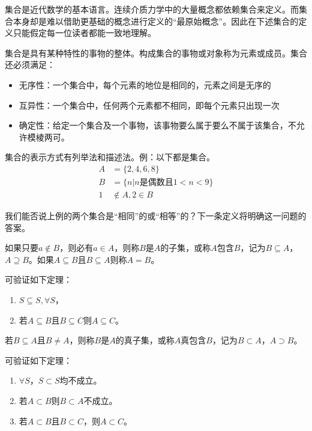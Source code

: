 \documentclass[main.tex]{subfiles}
\begin{document}
集合是近代数学的基本语言。连续介质力学中的大量概念都依赖集合来定义。而集合本身却是难以借助更基础的概念进行定义的“最原始概念”。因此在下述集合的定义只能假定每一位读者都能一致地理解。
\begin{definition}[集合]
集合是具有某种特性的事物的整体。构成集合的事物或对象称为元素或成员。集合还必须满足：
\begin{itemize}
    \item 无序性：一个集合中，每个元素的地位是相同的，元素之间是无序的
    \item 互异性：一个集合中，任何两个元素都不相同，即每个元素只出现一次
    \item 确定性：给定一个集合及一个事物，该事物要么属于要么不属于该集合，不允许模棱两可。
\end{itemize}
\end{definition}

集合的表示方式有列举法和描述法。例：以下都是集合。
\begin{align*}
    A&=\{2,4,6,8\}\\
    B&=\{n|n\text{是偶数且}1<n<9\}\\
    1&\notin A, 2\in B
\end{align*}

我们能否说上例的两个集合是“相同”的或“相等”的？下一条定义将明确这一问题的答案。

\begin{definition}[子集、包含、集合的相等]
如果只要\(a\notin B\)，则必有\(a\in A\)，则称$B$是$A$的子集，或称$A$包含$B$，记为\(B\subseteq A\)，\(A\supseteq B\)。如果\(A\subseteq B\)且\(B\subseteq A\)则称\(A=B\)。
\end{definition}

可验证如下定理：

\begin{theorem}
\begin{enumerate}
\item \(S\subseteq S, \forall S\)，
\item 若\(A\subseteq B\)且\(B\subseteq C\)则\(A\subseteq C\)。
\end{enumerate}
\end{theorem}

\begin{definition}
若\(B\subseteq A\)且\(B\neq A\)，则称$B$是$A$的真子集，或称$A$真包含$B$，记为\(B\subset A\)，\(A\supset B\)。
\end{definition}

可验证如下定理：
\begin{theorem}
\begin{enumerate}
    \item $\forall S$，$S\subset S$均不成立。
    \item 若$A\subset B$则$B\subset A$不成立。
    \item 若$A\subset B$且$B\subset C$，则$A\subset C$。
\end{enumerate}
\end{theorem}
\end{document}
